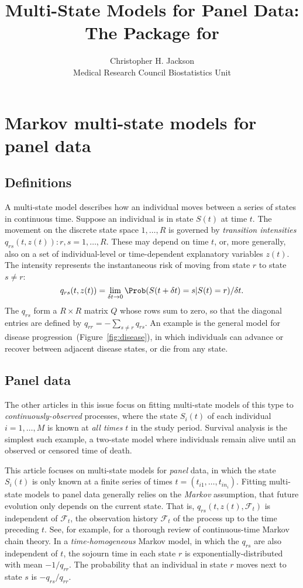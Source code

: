 \documentclass[article,shortnames]{jss}
\author{Christopher H. Jackson\\Medical Research Council Biostatistics Unit}
\title{Multi-State Models for Panel Data: The \pkg{msm} Package for \proglang{R}}
\begin{document}
\section{Markov multi-state models for panel data}
\label{sec:intro}

\subsection{Definitions}

A multi-state model describes how an individual moves between a series
of states in continuous time. Suppose an individual is in state $S(t)$
at time $t$. The movement on the discrete state space $1,\ldots,R$ is
governed by \emph{transition intensities} $q_{rs}(t,z(t)):
r,s=1,\ldots,R$. These may depend on time $t$, or, more generally,
also on a set of individual-level or time-dependent explanatory
variables $z(t)$.  The intensity represents the instantaneous risk of
moving from state $r$ to state $s \neq r$:
\[
  q_{rs}(t, z(t))  =  \lim_{\delta t \rightarrow 0} \Prob (S(t+\delta t) = s | S(t) = r) / \delta t.
\]
The $q_{rs}$ form a $R \times R$ matrix $Q$ whose rows sum to zero, so
that the diagonal entries are defined by $q_{rr} = - \sum_{s \neq r}
q_{rs}$.  An example is the general model for disease
progression~(Figure~\ref{fig:disease}), in which individuals can
advance or recover between adjacent disease states, or die from any
state.

\subsection{Panel data}

The other articles in this issue focus on fitting multi-state models
of this type to \emph{continuously-observed} processes, where the
state $S_i(t)$ of each individual $i=1,\ldots,M$ is known at \emph{all
  times} $t$ in the study period.  Survival analysis is the simplest
such example, a two-state model where individuals remain alive until
an observed or censored time of death.

This article focuses on multi-state models for \emph{panel} data, in
which the state $S_i(t)$ is only known at a finite series of times $t
= (t_{i1}, \ldots, t_{in_i})$.  Fitting multi-state models to panel
data generally relies on the \emph{Markov} assumption, that future
evolution only depends on the current state.  That is, $q_{rs}(t,
z(t), \mathcal{F}_t)$ is independent of $\mathcal{F}_t$, the
observation history $\mathcal{F}_t$ of the process up to the time
preceding $t$.  See, for example, \citet{cox:miller} for a thorough
review of continuous-time Markov chain theory.  In a
\emph{time-homogeneous} Markov model, in which the $q_{rs}$ are also
independent of $t$, the sojourn time in each state $r$ is
exponentially-distributed with mean $-1/q_{rr}$.  The probability that
an individual in state $r$ moves next to state $s$ is $-q_{rs} /
q_{rr}$.
\end{document}
